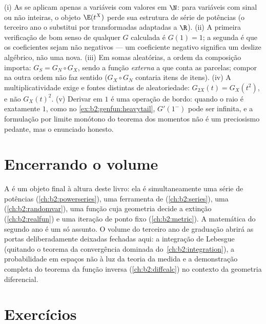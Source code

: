 \begin{remark}
(i) As  se aplicam apenas a variáveis com valores em $\N$:
para variáveis com sinal ou não inteiras, o objeto $\E(t^X)$
perde sua estrutura de série de potências (o terceiro ano o substitui por
transformadas adaptadas a $\R$). (ii) A primeira verificação de bom senso de
qualquer $G$ calculada é $G(1) = 1$; a segunda é que os
coeficientes sejam não negativos --- um coeficiente negativo
significa um deslize algébrico, não uma  nova. (iii) Em somas aleatórias,
a ordem da composição importa: $G_S = G_N \circ G_X$, sendo a função
\emph{externa} a que conta as parcelas; compor na outra
ordem não faz sentido ($G_X \circ G_N$ contaria itens
de itens). (iv) A multiplicatividade exige  e
fontes distintas de aleatoriedade: $G_{2X}(t) = G_X(t^2)$, e não
$G_X(t)^2$. (v) Derivar em $1$ é uma operação
de bordo: quando o raio é exatamente $1$, como no
\cref{ex:b2:genfun:heavytail}, $G'(1^-)$ pode ser infinita,
e a formulação por limite monótono do teorema dos momentos não é
um preciosismo pedante, mas o enunciado honesto.
\end{remark}

\section*{Encerrando o volume}

A  é um objeto final à altura deste livro:
ela é simultaneamente uma série de potências (\cref{ch:b2:powerseries}), uma
ferramenta de  (\cref{ch:b2:series}), uma 
(\cref{ch:b2:randomvar}), uma função  cuja geometria decide a
extinção (\cref{ch:b2:realfun}) e uma iteração de ponto fixo
(\cref{ch:b2:metric}). A matemática do segundo ano é um só assunto.
O volume do terceiro ano de graduação abrirá as portas deliberadamente deixadas
fechadas aqui: a integração de Lebesgue (quitando o teorema da
convergência dominada do~\cref{ch:b2:integration}), a
probabilidade em espaços não  à luz da teoria da medida e a
demonstração completa do teorema da função inversa
(\cref{ch:b2:diffcalc}) no contexto da geometria diferencial.

\section{Exercícios}

